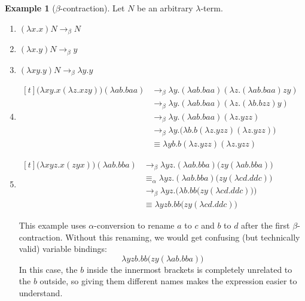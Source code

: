 \documentclass[a4paper, 11pt]{article}
\theoremstyle{plain}
\theoremstyle{definition}
\newtheorem{example}{Example}[section]
\theoremstyle{remark}
\newcommand\acong{\equiv_\alpha}
\newcommand\bcon{\mathrel{\rightarrow_\beta}}
\begin{document}
\begin{example}[$\beta$-contraction]\label{ex:beta-contraction}
Let $N$ be an arbitrary $\lambda$-term.
\begin{enumerate}[(1)]
\item $(\lambda x . x) N \bcon N$

\item $(\lambda x . y) N \bcon y$

\item $(\lambda xy . y) N \bcon \lambda y . y$

\item $\begin{aligned}[t]
\big( \lambda xy . x (\lambda z . xzy) \big) (\lambda ab . baa)
    &\bcon \lambda y . (\lambda ab . baa) (\lambda z . (\lambda ab . baa) zy) \\
    &\bcon \lambda y . (\lambda ab . baa) (\lambda z . (\lambda b . bzz) y) \\
    &\bcon \lambda y . (\lambda ab . baa) (\lambda z . yzz) \\
    &\bcon \lambda y . \big( \lambda b . b (\lambda z . yzz) (\lambda z . yzz) \big) \\
    &\equiv \lambda yb . b (\lambda z . yzz) (\lambda z . yzz)
\end{aligned}$

\item $\begin{aligned}[t]
\big( \lambda xyz . x (z y x) \big) (\lambda ab . b b a)
    &\bcon \lambda yz . (\lambda ab . b b a) \big( z y (\lambda ab . b b a) \big) \\
    &\acong \lambda yz . (\lambda ab . b b a) \big( z y (\lambda cd . d d c) \big) \\
    &\bcon \lambda yz . \Big( \lambda b . b b \big( z y (\lambda cd . d d c) \big) \Big) \\
    &\equiv \lambda yzb . b b \big( z y (\lambda cd . d d c) \big)
\end{aligned}$

This example uses $\alpha$-conversion to rename $a$ to $c$ and $b$ to $d$ after the first $\beta$-contraction. Without this renaming, we would get confusing (but technically valid) variable bindings: \[
\lambda yzb . b b \big( z y (\lambda ab . b b a) \big)
\] In this case, the $b$ inside the innermost brackets is completely unrelated to the $b$ outside, so giving them different names makes the expression easier to understand.


\end{enumerate}
\end{example}
\end{document}
